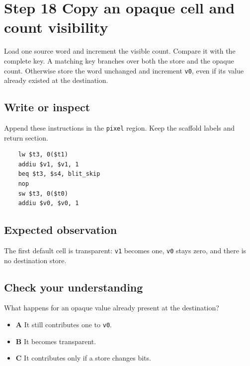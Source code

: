 \section{Step 18 Copy an opaque cell and count visibility}\label{blit-s18}

Load one source word and increment the visible count. Compare it with the complete key. A matching key branches over both the store and the opaque count. Otherwise store the word unchanged and increment \texttt{v0}, even if its value already existed at the destination.

\subsection{Write or inspect}
Append these instructions in the \texttt{pixel} region. Keep the scaffold labels and return section.

\begin{verbatim}
    lw $t3, 0($t1)
    addiu $v1, $v1, 1
    beq $t3, $s4, blit_skip
    nop
    sw $t3, 0($t0)
    addiu $v0, $v0, 1
\end{verbatim}

\subsection{Expected observation}
The first default cell is transparent: \texttt{v1} becomes one, \texttt{v0} stays zero, and there is no destination store.

\subsection{Check your understanding}
What happens for an opaque value already present at the destination?

\begin{itemize}
  \item \textbf{A} It still contributes one to \texttt{v0}.
  \item \textbf{B} It becomes transparent.
  \item \textbf{C} It contributes only if a store changes bits.
\end{itemize}
